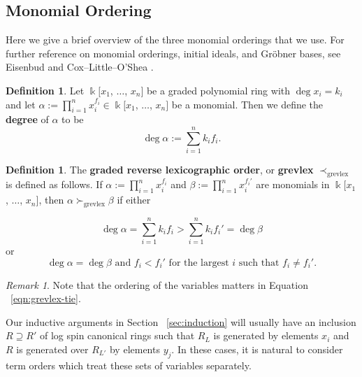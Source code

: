 \documentclass{amsart}
\theoremstyle{plain}
\theoremstyle{definition}
\newtheorem{defn}[thm]{Definition}
\theoremstyle{remark}
\newtheorem{rem}[thm]{Remark}
\numberwithin{equation}{section}
\newcommand\ssec{\subsection}
\newcommand\Bk{{\Bbbk}}
\newcommand{\halfcan}{L}
\begin{document}
\ssec{Monomial Ordering}
\label{ssec:monomial-order}
Here we give a brief overview of the three monomial orderings
that we use. For further reference on monomial orderings,
initial ideals, and Gr\"{o}bner bases, see Eisenbud
\cite[Section 15.9]{eisenbud:comm-alg} and Cox--Little--O'Shea
\cite[Chapter 2]{cls:ideals-varieties-algorithms}.

\begin{defn}
\label{defn:monomial-degree}
Let $\Bk[x_1$, $\ldots$, $x_n]$ be a graded polynomial
ring with $\deg x_i = k_i$ and let $\alpha := \prod_{i = 1}^{n} x_{i}^{f_i} \in
\Bk[x_{1}$, $\ldots$, $x_{n}]$ be a monomial. Then
we define the {\bf degree} of $\alpha$ to be
\[
	\deg \alpha := \sum_{i = 1}^{n} k_i f_i.
\]
\end{defn}

\begin{defn}
\label{defn:grevlex}
The {\bf graded reverse lexicographic order}, or {\bf grevlex} $\prec_{\text{grevlex}}$ is defined as follows.
If $\alpha := \prod_{i = 1}^{n} x_{i}
^{f_i}$ and $\beta := \prod_{i = 1}^{n} x_{i}^{f_i'}$ are
monomials in $\Bk[x_{1}$, $\ldots$, $x_{n}]$, then $\alpha
\succ_{\text{grevlex}} \beta$ if either

\begin{equation}
	\deg \alpha = \sum_{i = 1}^{n} k_i f_i  > \sum_{i = 1}^{n} k_i f_i' = \deg \beta
\end{equation}
or
\begin{equation}
\label{eqn:grevlex-tie}
	\deg \alpha = \deg \beta \text{ and }	f_i < f_i' \text{ for
	the	largest } i \text{ such that } f_i \neq f_i'.
\end{equation}
\end{defn}

\begin{rem}
Note that the ordering of the variables matters in Equation
~\ref{eqn:grevlex-tie}.
\end{rem}

Our inductive arguments in Section ~\ref{sec:induction} will
usually have an inclusion $R \supseteq R'$ of log spin canonical
rings such that $R_\halfcan$ is generated by elements $x_{i}$ and $R$
is generated over $R_{\halfcan'}$ by elements $y_j$. In these cases, it is
natural to consider term orders which treat these sets of variables
separately.
\end{document}
